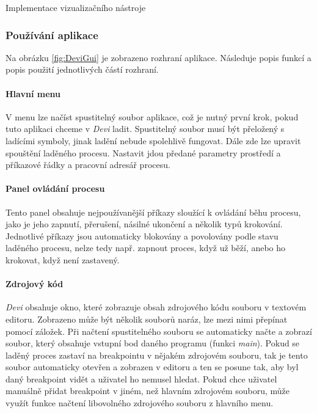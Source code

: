 \documentclass[czech,bachelor,male,python,dept460,hidelinks]{diploma}						%
\begin{document}
\begin{section}{Implementace vizualizačního nástroje}
	\subsubsection{Používání aplikace}
	Na obrázku \ref{fig:DeviGui} je zobrazeno rozhraní aplikace. Následuje popis funkcí a popis použití jednotlivých částí rozhraní.
	
	
	
	\paragraph*{Hlavní menu} V menu lze načíst spustitelný soubor aplikace, což je nutný první krok, pokud tuto aplikaci chceme v \textit{Devi} ladit.
		Spustitelný soubor musí být přeložený s ladícími symboly, jinak ladění nebude spolehlivě fungovat. Dále zde lze upravit spouštění laděného procesu.
		Nastavit jdou předané parametry prostředí a příkazové řádky a pracovní adresář procesu.
	\paragraph*{Panel ovládání procesu} Tento panel obsahuje nejpoužívanější příkazy sloužící k ovládání běhu procesu, jako je jeho zapnutí, přerušení, násilné
		ukončení a několik typů krokování. Jednotlivé příkazy jsou automaticky blokovány a povolovány podle stavu laděného procesu, nelze tedy např. zapnout
		proces, když už běží, anebo ho krokovat, když není zastavený.
	\paragraph*{Zdrojový kód} \textit{Devi} obsahuje okno, které zobrazuje obsah zdrojového kódu souboru v textovém editoru. Zobrazeno může být několik souborů naráz,
		lze mezi nimi přepínat pomocí záložek. Při načtení spustitelného souboru se automaticky načte a zobrazí soubor, který obsahuje vstupní bod daného programu
		(funkci \textit{main}). Pokud se laděný proces zastaví na breakpointu v nějakém zdrojovém souboru, tak je tento soubor automaticky otevřen a zobrazen
		v editoru a ten se posune tak, aby byl daný breakpoint vidět a uživatel ho nemusel hledat. Pokud chce uživatel manuálně přidat breakpoint v jiném, než
		hlavním zdrojovém souboru, může využít funkce načtení libovolného zdrojového souboru z hlavního menu.
		

\end{section}
\end{document}

